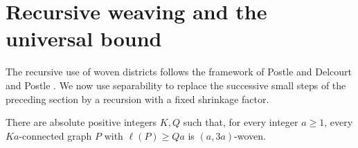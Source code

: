 \section{Recursive weaving and the universal bound}\label{sec:recursion}

The recursive use of woven districts follows the framework of
Postle \cite[Section~6]{Postle2020} and Delcourt and Postle
\cite[Section~7]{DelcourtPostle2021}. We now use separability to replace
the successive small steps of the preceding section by a recursion with
a fixed shrinkage factor.

\begin{theorem}\label{thm:recursive-woven}
There are absolute positive integers $K,Q$ such that, for every integer
$a\ge1$, every $Ka$-connected graph $P$ with $\ell(P)\ge Qa$ is
$(a,3a)$-woven.
\end{theorem}
